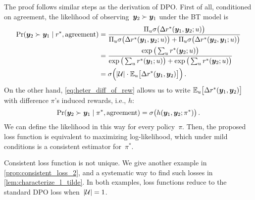\begin{proofEnd}
    The proof follows similar steps as the derivation of DPO. First of all, conditioned on agreement, the likelihood of observing~${\bm{y}}_2 \succ {\bm{y}}_1$ under the BT model is
    \begin{align*}
        \Pr({\bm{y}}_2 \succ {\bm{y}}_1 \mid r^*, {\rm agreement}) &= \frac{\Pi_u \sigma\big(\Delta r^*({\bm{y}}_1, {\bm{y}}_2; u)\big)}{\Pi_u \sigma\big(\Delta r^*({\bm{y}}_1, {\bm{y}}_2; u)\big) + \Pi_u \sigma\big(\Delta r^*({\bm{y}}_2, {\bm{y}}_1; u)\big)} \\
        &= \frac{\exp\big(\sum_u r^*({\bm{y}}_2; u)\big)}{\exp\big(\sum_u r^*({\bm{y}}_1; u)\big) + \exp\big(\sum_u r^*({\bm{y}}_2; u)\big)} \\
        &= \sigma\Big(|{\mathcal{U}}| \cdot \mathbb{E}_u\big[\Delta r^*({\bm{y}}_1, {\bm{y}}_2)\big]\Big)
        \,.
    \end{align*}
    On the other hand, \cref{eq:heter_diff_of_rew} allows us to write $\mathbb{E}_u\big[\Delta r^*({\bm{y}}_1, {\bm{y}}_2)\big]$ with difference $\pi$'s induced rewards, i.e., $h$: 
    \begin{equation*}
        \Pr({\bm{y}}_2 \succ {\bm{y}}_1 \mid \pi^*, {\rm agreement}) = \sigma\big(h({\bm{y}}_1, {\bm{y}}_2; \pi^*)\big)
        \,.
    \end{equation*}
    We can define the likelihood in this way for every policy~$\pi$. Then, the proposed loss function is equivalent to maximizing log-likelihood, which under mild conditions is a consistent estimator for~$\pi^*$. 
\end{proofEnd}
Consistent loss function is not unique. We give another example in \cref{prop:consistent_loss_2}, and a systematic way to find such losses in \cref{lem:characterize_l_tilde}. In both examples, loss functions reduce to the standard DPO loss when~$|{\mathcal{U}}| = 1$.

